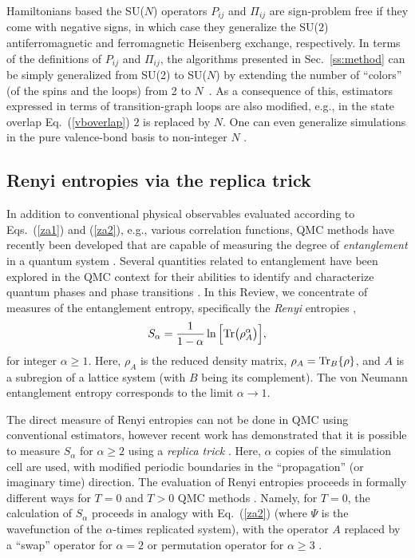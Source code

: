 \documentclass[10pt,pre,aps,twocolumn,showpacs,superscriptaddress,floatfix]{revtex4-1}
\begin{document}
Hamiltonians based the SU($N$) operators $P_{ij}$ and $\Pi_{ij}$ are sign-problem free if they come with negative signs, in which case
they generalize the SU($2$) antiferromagnetic and ferromagnetic Heisenberg exchange, respectively. In terms of the definitions of $P_{ij}$ and 
$\Pi_{ij}$, the algorithms presented in Sec.~\ref{ss:method} can be simply generalized from SU(2) to SU($N$) by extending the number of ``colors'' 
(of the spins and the loops) from 2 to $N$~\cite{harada2003:sun,beach2009:sun,kaul2011:j1j2}. As a consequence of this, estimators expressed in terms
of transition-graph loops are also modified, e.g., in the state overlap Eq.~(\ref{vboverlap}) $2$ is replaced by $N$. One can even generalize
simulations in the pure valence-bond basis to non-integer $N$ \cite{beach2009:sun}.

\subsection{Renyi entropies via the replica trick} 
\label{ss:renyi}

In addition to conventional physical observables evaluated according to Eqs.~(\ref{za1}) and (\ref{za2}), e.g., various correlation functions, 
QMC methods have recently been developed that are capable of measuring the degree of {\it entanglement} in a quantum system \cite{EntangleMeasure}. Several 
quantities related to entanglement have been explored in the QMC context for their abilities to identify and characterize quantum phases and phase 
transitions \cite{Tommaso1,Tommaso2,fluc1,fluc2,fid1,fid2}.  In this Review, we concentrate of measures of the entanglement entropy, specifically 
the {\it Renyi} entropies \cite{renyi},
\begin{equation}
S_{\alpha} = \frac{1}{1-\alpha} \ln \Big[ {\rm Tr}\big( \rho_A^{\alpha} \big) \Big],
\end{equation}
for integer $\alpha \ge 1$.  Here, $\rho_A$ is the reduced density matrix, $\rho_A = {\rm Tr}_B \{\rho\}$, and $A$ is a subregion of 
a lattice system (with $B$ being its complement). The von Neumann entanglement entropy corresponds to the limit $\alpha \to 1$.
 
The direct measure of Renyi entropies can not be done in QMC using conventional estimators, however recent work has demonstrated that it is possible to measure 
$S_{\alpha}$ for $\alpha \ge 2$ using a {\it replica trick} \cite{Holz,Cardy,Fradkin,BP,Naka}.  Here, $\alpha$ copies of the simulation cell are used, with modified 
periodic boundaries in the ``propagation'' (or imaginary time) direction.  The evaluation of Renyi entropies proceeds in formally different ways for $T=0$ and $T>0$ 
QMC methods \cite{Hastings10,Melko10}.  Namely, for $T=0$, the calculation of $S_{\alpha}$ proceeds in analogy with Eq.~(\ref{za2}) (where $\Psi$ is the wavefunction 
of the $\alpha$-times replicated system), with the operator $A$ replaced by a ``swap'' operator for $\alpha=2$ \cite{Hastings10} or permutation operator for 
$\alpha \ge 3$ \cite{Kallin11}. 
\end{document}
